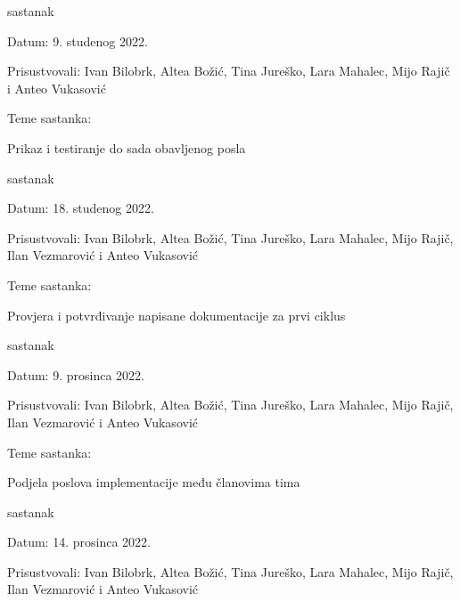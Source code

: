 \documentclass{article}
\begin{document}
\begin{packed_enum}
		\item sastanak
		\item[] \begin{packed_item}
			\item Datum: 9. studenog 2022. 
			\item Prisustvovali:  Ivan Bilobrk, Altea Božić, Tina Jureško, Lara Mahalec, Mijo Rajič i Anteo Vukasović
			\item Teme sastanka:
			\begin{packed_item}
				\item  Prikaz i testiranje do sada obavljenog posla
			\end{packed_item}
		\end{packed_item}
	
	\eject
	
	\item sastanak
	\item[] \begin{packed_item}
		\item Datum: 18. studenog 2022. 
		\item Prisustvovali:  Ivan Bilobrk, Altea Božić, Tina Jureško, Lara Mahalec, Mijo Rajič, Ilan Vezmarović i Anteo Vukasović
		\item Teme sastanka:
		\begin{packed_item}
			\item  Provjera i potvrđivanje napisane dokumentacije za prvi ciklus
		\end{packed_item}
		\end{packed_item}
	 	\item sastanak
		\item[] \begin{packed_item}
			\item Datum: 9. prosinca 2022. 
			\item Prisustvovali:  Ivan Bilobrk, Altea Božić, Tina Jureško, Lara Mahalec, Mijo Rajič, Ilan Vezmarović i Anteo Vukasović
			\item Teme sastanka:
			\begin{packed_item}
				\item  Podjela poslova implementacije među članovima tima
			\end{packed_item}
		\end{packed_item}
		\item sastanak
		\item[] \begin{packed_item}
			\item Datum: 14. prosinca 2022. 
			\item Prisustvovali:  Ivan Bilobrk, Altea Božić, Tina Jureško, Lara Mahalec, Mijo Rajič, Ilan Vezmarović i Anteo Vukasović

\end{packed_item}
\end{packed_enum}
\end{document}
